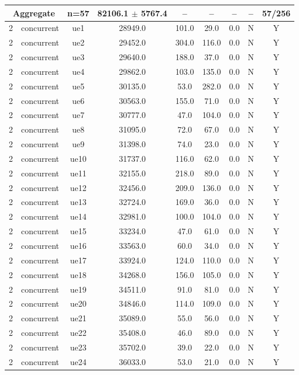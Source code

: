 \begin{table}[ht]
\begin{tabular}{|c|c|c|c|c|c|c|c|c|}
\multicolumn{2}{|c|}{\textbf{Aggregate}} & n=57 & 82106.1 $\pm$ 5767.4 & -- & -- & -- & -- & 57/256 \\
\hline
2 & concurrent & ue1 & 28949.0 & 101.0 & 29.0 & 0.0 & N & Y \\
2 & concurrent & ue2 & 29452.0 & 304.0 & 116.0 & 0.0 & N & Y \\
2 & concurrent & ue3 & 29640.0 & 188.0 & 37.0 & 0.0 & N & Y \\
2 & concurrent & ue4 & 29862.0 & 103.0 & 135.0 & 0.0 & N & Y \\
2 & concurrent & ue5 & 30135.0 & 53.0 & 282.0 & 0.0 & N & Y \\
2 & concurrent & ue6 & 30563.0 & 155.0 & 71.0 & 0.0 & N & Y \\
2 & concurrent & ue7 & 30777.0 & 47.0 & 104.0 & 0.0 & N & Y \\
2 & concurrent & ue8 & 31095.0 & 72.0 & 67.0 & 0.0 & N & Y \\
2 & concurrent & ue9 & 31398.0 & 74.0 & 23.0 & 0.0 & N & Y \\
2 & concurrent & ue10 & 31737.0 & 116.0 & 62.0 & 0.0 & N & Y \\
2 & concurrent & ue11 & 32155.0 & 218.0 & 89.0 & 0.0 & N & Y \\
2 & concurrent & ue12 & 32456.0 & 209.0 & 136.0 & 0.0 & N & Y \\
2 & concurrent & ue13 & 32724.0 & 169.0 & 36.0 & 0.0 & N & Y \\
2 & concurrent & ue14 & 32981.0 & 100.0 & 104.0 & 0.0 & N & Y \\
2 & concurrent & ue15 & 33234.0 & 47.0 & 61.0 & 0.0 & N & Y \\
2 & concurrent & ue16 & 33563.0 & 60.0 & 34.0 & 0.0 & N & Y \\
2 & concurrent & ue17 & 33924.0 & 124.0 & 110.0 & 0.0 & N & Y \\
2 & concurrent & ue18 & 34268.0 & 156.0 & 105.0 & 0.0 & N & Y \\
2 & concurrent & ue19 & 34511.0 & 91.0 & 81.0 & 0.0 & N & Y \\
2 & concurrent & ue20 & 34846.0 & 114.0 & 109.0 & 0.0 & N & Y \\
2 & concurrent & ue21 & 35089.0 & 55.0 & 56.0 & 0.0 & N & Y \\
2 & concurrent & ue22 & 35408.0 & 46.0 & 89.0 & 0.0 & N & Y \\
2 & concurrent & ue23 & 35702.0 & 39.0 & 22.0 & 0.0 & N & Y \\
2 & concurrent & ue24 & 36033.0 & 53.0 & 21.0 & 0.0 & N & Y \\

\end{tabular}
\end{table}
